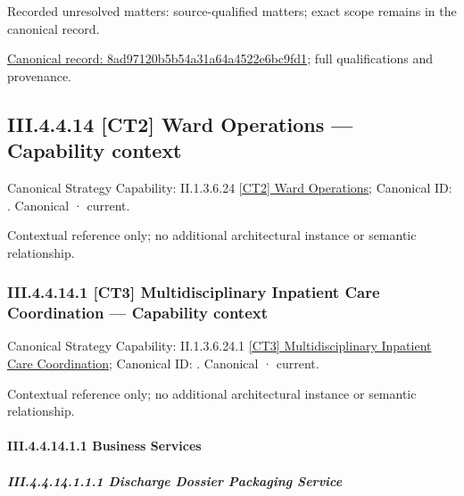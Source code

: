 {\small Recorded unresolved matters: source-qualified matters; exact scope remains in the canonical record.}\par
{\footnotesize \href{../../../../../../../continuum/business/business-process/8ad97120b5b54a31a64a4522e6bc9fd1.md}{Canonical record: 8ad97120b5b54a31a64a4522e6bc9fd1}; full qualifications and provenance.}\par
\subsection*{III.4.4.14 [CT2] Ward Operations — Capability context}
\label{navigation:III.4.4.14}

{\small Canonical Strategy Capability: II.1.3.6.24 \hyperref[element:f996ecca728f4942a88b034aca818a99]{[CT2] Ward Operations}; Canonical ID: \texttt{}. Canonical · current.}\par
Contextual reference only; no additional architectural instance or semantic relationship.\par
\subsubsection*{III.4.4.14.1 [CT3] Multidisciplinary Inpatient Care Coordination — Capability context}
\label{navigation:III.4.4.14.1}

{\small Canonical Strategy Capability: II.1.3.6.24.1 \hyperref[element:c798e38e12e5428dbb8b3cabc977d430]{[CT3] Multidisciplinary Inpatient Care Coordination}; Canonical ID: \texttt{}. Canonical · current.}\par
Contextual reference only; no additional architectural instance or semantic relationship.\par
\paragraph*{III.4.4.14.1.1 Business Services}
\label{navigation:III.4.4.14.1.1}

\subparagraph*{III.4.4.14.1.1.1 Discharge Dossier Packaging Service}
\label{navigation:III.4.4.14.1.1.1}

